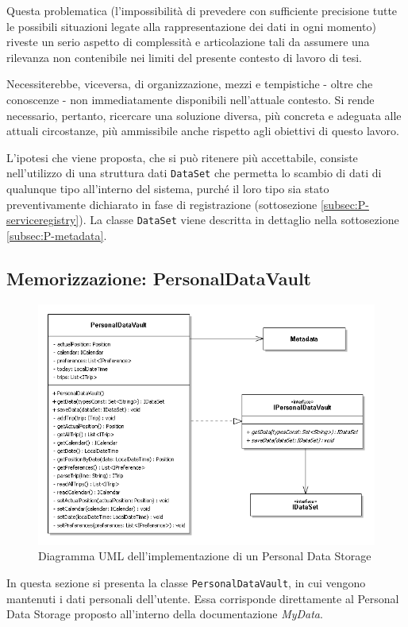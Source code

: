 Questa problematica (l’impossibilit\`a di prevedere con sufficiente precisione tutte le possibili situazioni legate alla rappresentazione dei dati in ogni momento) riveste un serio aspetto di complessit\`a e articolazione tali da assumere una rilevanza non contenibile nei limiti del presente contesto di lavoro di tesi.

Necessiterebbe, viceversa, di organizzazione, mezzi e tempistiche - oltre che conoscenze - non immediatamente disponibili nell'attuale contesto. Si rende necessario, pertanto, ricercare una soluzione diversa, pi\`u concreta e adeguata alle attuali circostanze, pi\`u ammissibile anche rispetto agli obiettivi di questo lavoro.

L'ipotesi che viene proposta, che si pu\`o ritenere pi\`u accettabile, consiste nell’utilizzo di una struttura dati \texttt{DataSet} che permetta lo scambio di dati di qualunque tipo all’interno del sistema, purch\'e il loro tipo sia stato preventivamente dichiarato in fase di registrazione (sottosezione \ref{subsec:P-serviceregistry}). La classe \texttt{DataSet} viene descritta in dettaglio nella sottosezione \ref{subsec:P-metadata}.

\subsection{Memorizzazione: PersonalDataVault}
\label{subsec:P-PDV}
\begin{figure} [h]
	\centering
	\includegraphics[width=0.8\linewidth]{pictures/PersonalDataVault.png}
	\caption{Diagramma UML dell'implementazione di un Personal Data Storage}
	\label{fig:PersonalDataVault}
\end{figure}
In questa sezione si presenta la classe \texttt{PersonalDataVault}, in cui vengono mantenuti i dati personali dell’utente. Essa corrisponde direttamente al Personal Data Storage proposto all’interno della documentazione \textit{MyData}.

